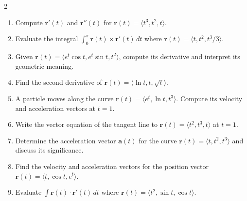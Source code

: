 \begin{multicols}{2}
\begin{enumerate}
    \item Compute \( \mathbf{r}'(t) \) and \( \mathbf{r}''(t) \) for \( \mathbf{r}(t) = \langle t^3, t^2, t \rangle \).
    \item Evaluate the integral \( \int_0^{\pi} \mathbf{r}(t) \times \mathbf{r}'(t) \, dt \) where \( \mathbf{r}(t) = \langle t, t^2, t^3/3 \rangle \).
    \item Given \( \mathbf{r}(t) = \langle e^t \cos t, e^t \sin t, t^2 \rangle \), compute its derivative and interpret its geometric meaning.
    \item Find the second derivative of \( \mathbf{r}(t) = \langle \ln t, t, \sqrt{t} \rangle \).
    \item A particle moves along the curve \( \mathbf{r}(t) = \langle e^t, \ln t, t^3 \rangle \). Compute its velocity and acceleration vectors at \( t = 1 \).
    \item Write the vector equation of the tangent line to \( \mathbf{r}(t) = \langle t^2, t^3, t \rangle \) at \( t = 1 \).
    \item Determine the acceleration vector \( \mathbf{a}(t) \) for the curve \( \mathbf{r}(t) = \langle t, t^2, t^3 \rangle \) and discuss its significance.
    \item Find the velocity and acceleration vectors for the position vector \( \mathbf{r}(t) = \langle t, \cos t, e^t \rangle \).
    \item Evaluate \( \int \mathbf{r}(t) \cdot \mathbf{r}'(t) \, dt \) where \( \mathbf{r}(t) = \langle t^2, \sin t, \cos t \rangle \).


\end{enumerate}
\end{multicols}
